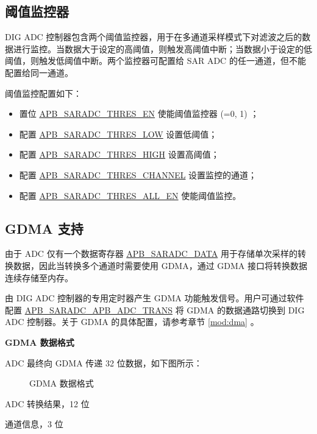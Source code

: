 \documentclass[main\_\_CN.tex]{subfiles}
\begin{document}
\subsection{阈值监控器}\label{sec:adc_threshold}

DIG ADC 控制器包含两个阈值监控器，用于在多通道采样模式下对滤波之后的数据进行监控。当数据大于设定的高阈值，则触发高阈值中断；当数据小于设定的低阈值，则触发低阈值中断。两个监控器可配置给 SAR ADC 的任一通道，但不能配置给同一通道。

阈值监控配置如下：
\begin{itemize}
    \item 置位 \hyperref[fielddesc:APBSARADCTHRESALLEN]{APB\_SARADC\_THRES\_EN} 使能阈值监控器  (=0, 1) ；
    \item 配置 \hyperref[fielddesc:APBSARADCTHRES0LOW]{APB\_SARADC\_THRES\_LOW} 设置低阈值；
    \item 配置 \hyperref[fielddesc:APBSARADCTHRES0HIGH]{APB\_SARADC\_THRES\_HIGH} 设置高阈值；
    \item 配置 \hyperref[fielddesc:APBSARADCTHRES0CHANNEL]{APB\_SARADC\_THRES\_CHANNEL} 设置监控的通道；
    \item 配置 \hyperref[fielddesc:APBSARADCTHRESALLEN]{APB\_SARADC\_THRES\_ALL\_EN} 使能阈值监控。
\end{itemize}

\subsection{GDMA 支持}

由于 ADC 仅有一个数据寄存器 \hyperref[fielddesc:APBSARADCDATA]{APB\_SARADC\_DATA} 用于存储单次采样的转换数据，因此当转换多个通道时需要使用 GDMA，通过 GDMA 接口将转换数据连续存储至内存。

由 DIG ADC 控制器的专用定时器产生 GDMA 功能触发信号。用户可通过软件配置 \hyperref[fielddesc:APBSARADCAPBADCTRANS]{APB\_SARADC\_APB\_ADC\_TRANS} 将 GDMA 的数据通路切换到 DIG ADC 控制器。关于 GDMA 的具体配置，请参考章节 \ref{mod:dma} \textit{}。

\textbf{GDMA 数据格式}

ADC 最终向 GDMA 传递 32 位数据，如下图所示：

\begin{figure}[H]
\centering
{}%
%
%
%
%
\end{figure}
\vspace{-2em}
\begin{figure}[H]
    \centering
    \caption{GDMA 数据格式}
    \label{fig:adc-dma-data-format}
\end{figure}
\vspace{-2em}
\begin{regdesc}\begin{reglist}
\item [data] ADC 转换结果，12 位
\item [ch\_sel] 通道信息，3 位
\end{reglist}\end{regdesc}
\end{document}

